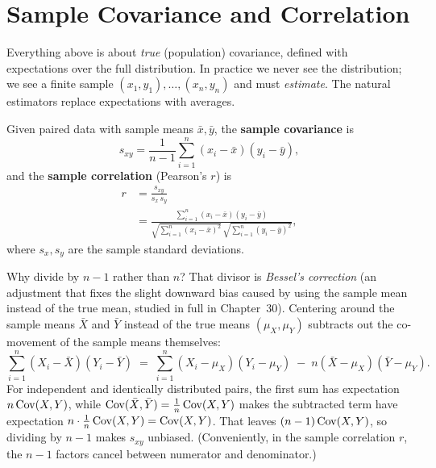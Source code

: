 \section{Sample Covariance and Correlation}
\label{ch14:sample}

Everything above is about \emph{true} (population) covariance, defined with
expectations over the full distribution. In practice we never see the distribution;
we see a finite sample $(x_1, y_1), \dots, (x_n, y_n)$ and must \emph{estimate}.
The natural estimators replace expectations with averages.

\begin{definition}
\label{ch14:def-sample}
Given paired data with sample means $\bar x, \bar y$, the \textbf{sample covariance}
is
\[
s_{xy} = \frac{1}{n-1} \sum_{i=1}^n (x_i - \bar x)(y_i - \bar y),
\]
and the \textbf{sample correlation} (Pearson's $r$) is
\begin{align*}
r &= \frac{s_{xy}}{s_x\, s_y} \\
&= \frac{\sum_{i=1}^n (x_i - \bar x)(y_i - \bar y)}
       {\sqrt{\sum_{i=1}^n (x_i - \bar x)^2}\,
        \sqrt{\sum_{i=1}^n (y_i - \bar y)^2}},
\end{align*}
where $s_x, s_y$ are the sample standard deviations.
\end{definition}

Why divide by $n - 1$ rather than $n$? That divisor is \emph{Bessel's correction} (an adjustment that fixes the slight downward bias caused by using the sample mean instead of the true mean, studied in full in Chapter~30). Centering around the sample means $\bar X$ and
$\bar Y$ instead of the true means $(\mu_X, \mu_Y)$ subtracts out the co-movement
of the sample means themselves:
\[
  \sum_{i=1}^n (X_i - \bar X)(Y_i - \bar Y)
  \;=\; \sum_{i=1}^n (X_i - \mu_X)(Y_i - \mu_Y) \;-\; n(\bar X - \mu_X)(\bar Y - \mu_Y).
\]
For independent and identically distributed pairs, the first sum has expectation
$n\operatorname{Cov}(X,Y)$, while $\operatorname{Cov}(\bar X, \bar Y) = \frac{1}{n}\operatorname{Cov}(X,Y)$ makes the
subtracted term have expectation $n \cdot \frac{1}{n}\operatorname{Cov}(X,Y) = \operatorname{Cov}(X,Y)$. That
leaves $(n - 1)\operatorname{Cov}(X,Y)$, so dividing by $n - 1$ makes $s_{xy}$ unbiased.
(Conveniently, in the sample correlation $r$, the $n - 1$ factors cancel between
numerator and denominator.)

